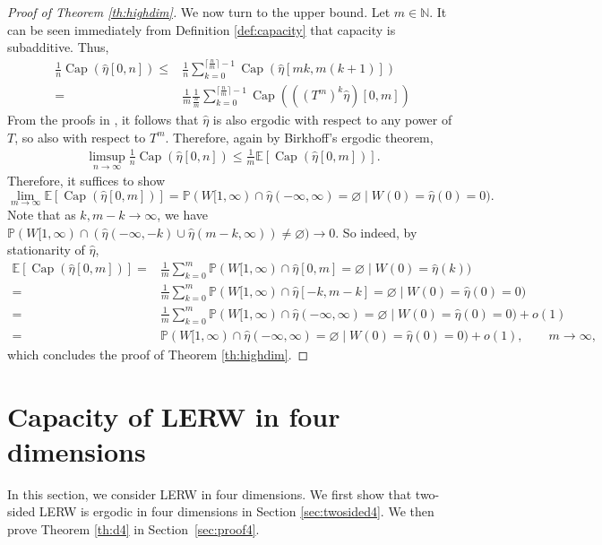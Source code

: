 \documentclass{article}
\DeclareMathOperator{\Ca}{Cap}
\newcommand{\N}{\mathbb{N}}
\renewcommand{\P}{\mathbb{P}}
\newcommand{\E}{\mathbb{E}}
\newcommand{\1}{\mathbf{1}}
\newcommand{\limm}{\lim_{m\rightarrow\infty}}
\newcommand{\heta}{\hat\eta}
\theoremstyle{definition}
\numberwithin{equation}{section}
\numberwithin{theorem}{section}
\begin{document}
\begin{proof}[Proof of Theorem \ref{th:highdim}]
We now turn to the upper bound. Let $m\in\N$. It can be seen immediately from Definition \ref{def:capacity} that capacity is subadditive. Thus,
\begin{equation}
	\begin{split}
		\frac{1}{n}\Ca(\heta[0,n])\leq&\frac{1}{n}\sum_{k=0}^{\lceil\frac{n}{m}\rceil-1}\Ca(\heta[mk,m(k+1)])\\
		=&\frac{1}{m}\frac{1}{\frac{n}{m}}\sum_{k=0}^{\lceil\frac{n}{m}\rceil-1}\Ca\left(((T^m)^k\heta)[0,m]\right)
	\end{split}
\end{equation}
From the proofs in \cite{lawler80selfavoiding}, it follows that $\heta$ is also ergodic with respect to any power of $T$, so also with respect to $T^m$. Therefore, again by Birkhoff's ergodic theorem,
\begin{equation}
	\begin{split}
		\limsup_{n\rightarrow\infty}\frac{1}{n}\Ca(\heta[0,n])\leq\frac{1}{m}\E[\Ca(\heta[0,m])].
	\end{split}
\end{equation}
Therefore, it suffices to show 
\begin{equation}
	\limm\E[\Ca(\heta[0,m])]=\P(W[1,\infty)\cap\heta(-\infty,\infty)=\varnothing\mid W(0)=\heta(0)=0).
\end{equation}
Note that as $k,m-k\rightarrow\infty$, we have $\P(W[1,\infty)\cap(\heta(-\infty,-k)\cup\heta(m-k,\infty))\neq\varnothing)\rightarrow0$. So indeed, by stationarity of $\heta$,
\begin{equation}
	\begin{split}
		\E[\Ca(\heta[0,m])]=&\frac{1}{m}\sum_{k=0}^m\P(W[1,\infty)\cap\heta[0,m]=\varnothing\mid W(0)=\heta(k))\\
		=&\frac{1}{m}\sum_{k=0}^m\P(W[1,\infty)\cap\heta[-k,m-k]=\varnothing\mid W(0)=\heta(0)=0)\\
		=&\frac{1}{m}\sum_{k=0}^m\P(W[1,\infty)\cap\heta(-\infty,\infty)=\varnothing\mid W(0)=\heta(0)=0)+o(1)\\
		=&\P(W[1,\infty)\cap\heta(-\infty,\infty)=\varnothing\mid W(0)=\heta(0)=0)+o(1),\qquad m\rightarrow\infty,
	\end{split}
\end{equation}
which concludes the proof of Theorem \ref{th:highdim}.
\end{proof}


\section{Capacity of LERW in four dimensions}\label{sec:d4}
In this section, we consider LERW in four dimensions. We first show that two-sided LERW is ergodic in four dimensions in Section \ref{sec:twosided4}. We then prove Theorem \ref{th:d4} in Section~\ref{sec:proof4}.
\end{document}
